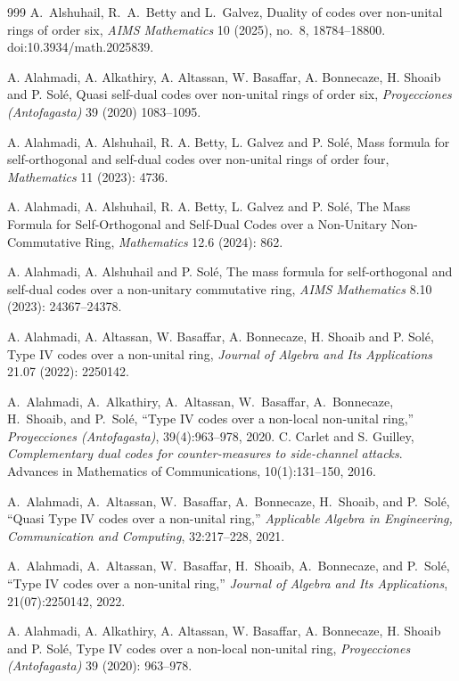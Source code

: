 \documentclass[11pt,a4paper]{article}
\theoremstyle{definition}
\numberwithin{equation}{section}
\begin{document}
\begin{thebibliography}{999}
A.~Alshuhail, R.~A.~Betty and L.~Galvez,
Duality of codes over non-unital rings of order six,
{\em AIMS Mathematics} 10 (2025), no.~8, 18784--18800. doi:10.3934/math.2025839.


A. Alahmadi, A. Alkathiry, A. Altassan, W. Basaffar, A. Bonnecaze, H. Shoaib and P. Solé,
Quasi self-dual codes over non-unital rings of order six,
{\em Proyecciones (Antofagasta)} 39 (2020) 1083–1095.

A. Alahmadi, A. Alshuhail, R. A. Betty, L. Galvez and P. Solé,
Mass formula for self-orthogonal and self-dual codes over non-unital rings of order four,
{\em Mathematics} 11 (2023): 4736.

A. Alahmadi, A. Alshuhail, R. A. Betty, L. Galvez and P. Solé,
The Mass Formula for Self-Orthogonal and Self-Dual Codes over a Non-Unitary Non-Commutative Ring,
{\em Mathematics} 12.6 (2024): 862.

A. Alahmadi, A. Alshuhail and P. Solé,
The mass formula for self-orthogonal and self-dual codes over a non-unitary commutative ring,
{\em AIMS Mathematics} 8.10 (2023): 24367–24378.

A. Alahmadi, A. Altassan, W. Basaffar, A. Bonnecaze, H. Shoaib and P. Solé,
Type IV codes over a non-unital ring,
{\em Journal of Algebra and Its Applications} 21.07 (2022): 2250142.

A.~Alahmadi, A.~Alkathiry, A.~Altassan, W.~Basaffar, A.~Bonnecaze, H.~Shoaib, and P.~Sol{\'e},
``Type IV codes over a non-local non-unital ring,''
\emph{Proyecciones (Antofagasta)}, 39(4):963--978, 2020.
C. Carlet and S. Guilley,
\emph{Complementary dual codes for counter-measures to side-channel attacks}.
Advances in Mathematics of Communications, 10(1):131--150, 2016.

A.~Alahmadi, A.~Altassan, W.~Basaffar, A.~Bonnecaze, H.~Shoaib, and P.~Sol{\'e},
``Quasi Type IV codes over a non-unital ring,''
\emph{Applicable Algebra in Engineering, Communication and Computing}, 32:217--228, 2021.

A.~Alahmadi, A.~Altassan, W.~Basaffar, H.~Shoaib, A.~Bonnecaze, and P.~Sol{\'e},
``Type IV codes over a non-unital ring,''
\emph{Journal of Algebra and Its Applications}, 21(07):2250142, 2022.

A. Alahmadi, A. Alkathiry, A. Altassan, W. Basaffar, A. Bonnecaze, H. Shoaib and P. Solé,
Type IV codes over a non-local non-unital ring,
{\em Proyecciones (Antofagasta)} 39 (2020): 963–978.


\end{thebibliography}
\end{document}
